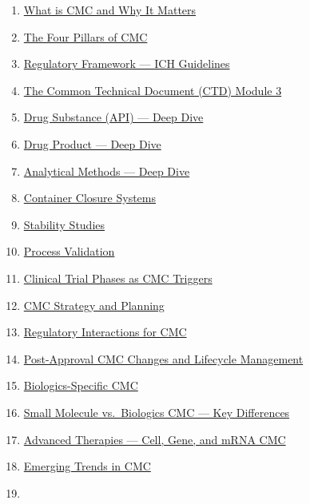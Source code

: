 \documentclass[
  11pt,
  a4paper,
]{report}
\providecommand{\tightlist}{%
  \setlength{\itemsep}{0pt}\setlength{\parskip}{0pt}}
\begin{document}
\begin{enumerate}
\def\labelenumi{\arabic{enumi}.}
\tightlist
\item
  \protect\hyperlink{1-what-is-cmc-and-why-it-matters}{What is CMC and
  Why It Matters}
\item
  \protect\hyperlink{2-the-four-pillars-of-cmc}{The Four Pillars of CMC}
\item
  \protect\hyperlink{3-regulatory-framework--ich-guidelines}{Regulatory
  Framework --- ICH Guidelines}
\item
  \protect\hyperlink{4-the-common-technical-document-ctd-module-3}{The
  Common Technical Document (CTD) Module 3}
\item
  \protect\hyperlink{5-drug-substance-api--deep-dive}{Drug Substance
  (API) --- Deep Dive}
\item
  \protect\hyperlink{6-drug-product--deep-dive}{Drug Product --- Deep
  Dive}
\item
  \protect\hyperlink{7-analytical-methods--deep-dive}{Analytical Methods
  --- Deep Dive}
\item
  \protect\hyperlink{8-container-closure-systems}{Container Closure
  Systems}
\item
  \protect\hyperlink{9-stability-studies}{Stability Studies}
\item
  \protect\hyperlink{10-process-validation}{Process Validation}
\item
  \protect\hyperlink{11-clinical-trial-phases-as-cmc-triggers}{Clinical
  Trial Phases as CMC Triggers}
\item
  \protect\hyperlink{12-cmc-strategy-and-planning}{CMC Strategy and
  Planning}
\item
  \protect\hyperlink{13-regulatory-interactions-for-cmc}{Regulatory
  Interactions for CMC}
\item
  \protect\hyperlink{14-post-approval-cmc-changes-and-lifecycle-management}{Post-Approval
  CMC Changes and Lifecycle Management}
\item
  \protect\hyperlink{15-biologics-specific-cmc}{Biologics-Specific CMC}
\item
  \protect\hyperlink{16-small-molecule-vs-biologics-cmc--key-differences}{Small
  Molecule vs.~Biologics CMC --- Key Differences}
\item
  \protect\hyperlink{17-advanced-therapies--cell-gene-and-mrna-cmc}{Advanced
  Therapies --- Cell, Gene, and mRNA CMC}
\item
  \protect\hyperlink{18-emerging-trends-in-cmc}{Emerging Trends in CMC}
\item

\end{enumerate}
\end{document}
